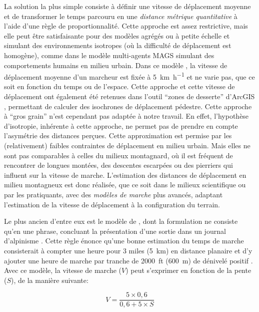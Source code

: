 La solution la plus simple consiste à définir une vitesse de
déplacement moyenne et de transformer le temps parcouru en une
\emph{distance métrique quantitative} à l'aide d'une règle de
proportionnalité. Cette approche est assez restrictive, mais elle peut
être satisfaisante pour des modèles agrégés ou à petite échelle et
simulant des environnements isotropes (\ie où la difficulté de
déplacement est homogène), comme dans le modèle multi-agents MAGS
\autocite{Moulin2003} simulant des comportements humains en milieu
urbain. Dans ce modèle \autocite{Moulin2003}, la vitesse de
déplacement moyenne d'un marcheur est fixée à
\SI{5}{\kilo\meter\per\hour} et ne varie pas, que ce soit en fonction
du temps ou de l'espace. Cette approche et cette vitesse de
déplacement ont également été retenues dans l'outil \enquote{zones de
  desserte} d'ArcGIS \autocite{ESRI2020}, permettant de calculer des
isochrones de déplacement pédestre. Cette approche à \enquote{gros
  grain} n'est cependant pas adaptée à notre travail. En effet,
l’hypothèse d'isotropie, inhérente à cette approche, ne permet pas de
prendre en compte l'asymétrie des distances perçues. Cette
approximation est permise par les (relativement) faibles contraintes
de déplacement en milieu urbain. Mais elles ne sont pas comparables à
celles du milieux montagnard, où il est fréquent de rencontrer de
longues montées, des descentes escarpées ou des pierriers qui influent
sur la vitesse de marche. L'estimation des distances de déplacement en
milieu montagneux est donc réalisée, que ce soit dans le milieux
scientifique ou par les pratiquants, avec des \emph{modèles de marche}
plus avancés, adaptant l'estimation de la vitesse de déplacement à la
configuration du terrain.

Le plus ancien d'entre eux est le modèle de \textcite{Naismith1892},
dont la formulation ne consiste qu'en une phrase, concluant la
présentation d'une sortie dans un journal d'alpinisme
\autocite{Duchene2019}. Cette règle énonce qu'une bonne estimation du
temps de marche consisterait à compter une heure pour 3 miles
(\SI{5}{\kilo\meter}) en distance planaire et d'y ajouter une heure de
marche par tranche de \SI{2000}{ft} (\SI{600}{\meter}) de dénivelé
positif \autocite{Naismith1892}. Avec ce modèle, la vitesse de marche
(\(V\)) peut s'exprimer en fonction de la pente (\(S\)), de la manière
suivante:

\begin{equation}
  \label{eq:marche_naismith}
  V = \dfrac{5 × 0,6}{0,6 + 5 × S}
\end{equation}

